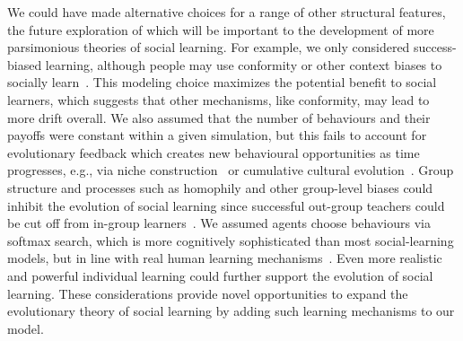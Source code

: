 \documentclass[letterpaper,11.5pt]{scrartcl}
\begin{document}
We could have made alternative choices for a range of other structural features, the future exploration of which
will be important to the development of more parsimonious theories of social learning.  
For example, we only considered success-biased learning, although people may use conformity or other context biases to socially learn~\citep{BoydRicherson1985,Muthukrishna2016a,Smaldino2018b}. This modeling
choice maximizes the potential benefit to social learners, which suggests that
other mechanisms, like conformity, may lead to more drift overall. We also assumed that the number of behaviours and their payoffs were constant within a given simulation, but this fails to account for evolutionary feedback which creates new behavioural opportunities as time progresses, e.g., via niche construction~\citep{Smaldino2012a,Heras-Escribano2020} or cumulative cultural evolution~\citep{Smolla2019,Derex2020}.  Group structure and processes such as homophily and other group-level biases could inhibit the evolution of social learning since successful out-group teachers could be cut off from in-group learners~\citep{Golub2012}. We assumed agents choose behaviours via softmax
search, which is more cognitively sophisticated than most social-learning models, but in line with real human learning
mechanisms~\citep{Schulz2020a,Wu2022}. Even more realistic and powerful individual learning could further support the evolution of
social learning. These considerations provide novel opportunities to expand the evolutionary theory of social learning by adding
such learning mechanisms to our model.

\end{document}
